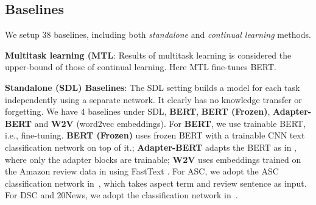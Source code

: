 \documentclass{article}
\begin{document}
\subsection{Baselines}
\label{sec:baselines}

We setup 38 baselines, including both \textit{standalone} and \textit{continual learning} methods. 

\textbf{Multitask learning (MTL}: Results of multitask learning is considered the upper-bound of those of continual learning. Here MTL fine-tunes BERT. 


\textbf{Standalone (SDL) Baselines}: The SDL setting builds a model for each task independently using a separate network. It clearly has no knowledge transfer or forgetting. We have 4 baselines under SDL, \textbf{BERT}, \textbf{BERT (Frozen)}, \textbf{Adapter-BERT} and \textbf{W2V} (word2vec embeddings). For \textbf{BERT}, we use trainable BERT, i.e., fine-tuning.  {\textbf{BERT (Frozen)} uses frozen BERT with a {trainable} CNN text classification network \cite{DBLP:conf/emnlp/Kim14} on top of it.}; \textbf{Adapter-BERT} adapts the BERT as in \cite{Houlsby2019Parameter}, where only the adapter blocks are trainable; \textbf{W2V} uses embeddings 
trained on the Amazon review data in \cite{Xu2018pro} using FastText \cite{grave2018learning}. For ASC,
we adopt the ASC classification network in~\cite{DBLP:conf/acl/LiX18}, which takes aspect term and review sentence as input. For DSC and 20News,
we adopt the classification network in~\cite{DBLP:conf/naacl/DevlinCLT19}.
\end{document}
